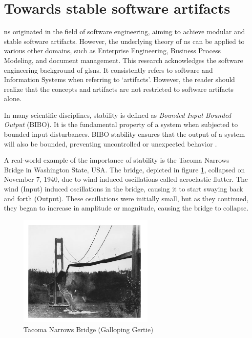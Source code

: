\section{Towards stable software artifacts} \label{sec:on_stability}

\gls{ns} originated in the field of software engineering, aiming to achieve modular and
stable software artifacts. However, the underlying theory of \gls{ns} can be applied to
various other domains, such as Enterprise Engineering, Business Process Modeling, and
document management. This research acknowledges the software engineering background of
gls{ns}. It consistently refers to software and Information Systems when referring to
\enquote*{artifacts}. However, the reader should realize that the concepts and artifacts
are not restricted to software artifacts alone.

In many scientific disciplines, stability is defined as \emph{Bounded Input Bounded
Output} (BIBO). It is the fundamental property of a system when subjected to bounded input
disturbances. BIBO stability ensures that the output of a system will also be bounded,
preventing uncontrolled or unexpected behavior \parencite[270]{mannaert_normalized_2016}. 

A real-world example of the importance of stability is the Tacoma Narrows Bridge in
Washington State, USA. The bridge, depicted in figure \ref*{fig:bridge}, collapsed on
November 7, 1940, due to wind-induced oscillations called aeroelastic flutter. The wind (Input)
induced oscillations in the bridge, causing it to start swaying back and forth (Output). These
oscillations were initially small, but as they continued, they began to increase in
amplitude or magnitude, causing the bridge to collapse.

\begin{figure}[H]
    \centering
    \includegraphics[width=0.6\textwidth]{Figures/bridge.pdf}
    \caption[TNB]{Tacoma Narrows Bridge (Galloping Gertie)}
    \label{fig:bridge}
\end{figure}

